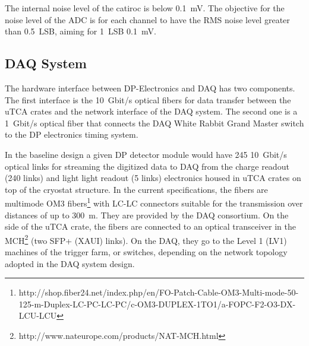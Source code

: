 The internal noise level of the catiroc is below \SI{0.1}{\milli\volt}. The objective for the noise level of the ADC is for each channel to have the RMS noise level greater than \SI{0.5}{LSB}, aiming for \SI{1}{LSB} \SI{0.1}{\milli\volt}.

\subsection{DAQ System}
\label{sec:fddp-tpc-elec-intfc-daq}

The hardware interface between DP-Electronics and DAQ has two components. The first interface is the \SI{10}{Gbit/s} optical fibers for data transfer between the uTCA crates and the network interface of the DAQ system. The second one is a \SI{1}{Gbit/s} optical fiber that connects the DAQ White Rabbit Grand Master switch to the DP electronics timing system.   

In the baseline design a given DP detector module would have \num{245} \SI{10}{Gbit/s} optical links for streaming the digitized data to DAQ from the charge readout (\num{240} links) and light light readout (\num{5} links) electronics housed in uTCA crates on top of the cryostat structure.  In the current specifications, the fibers are multimode OM3 fibers\footnote{http://shop.fiber24.net/index.php/en/FO-Patch-Cable-OM3-Multi-mode-50-125-m-Duplex-LC-PC-LC-PC/c-OM3-DUPLEX-1TO1/a-FOPC-F2-O3-DX-LCU-LCU} with LC-LC connectors suitable for the transmission over distances of up to \SI{300}{\metre}.  They are provided by the DAQ consortium. On the side of the uTCA crate, the fibers are connected to an optical transceiver in the MCH\footnote{http://www.nateurope.com/products/NAT-MCH.html} (two SFP+ (XAUI) links).  On the DAQ, they go to the Level 1 (LV1) machines of the trigger farm, or switches, depending on the network topology adopted in the DAQ system design.

